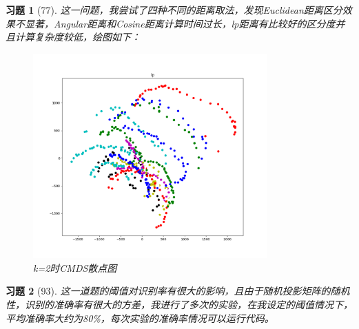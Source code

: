\documentclass[a4paper, UTF8]{ctexart}
\newtheorem*{exercise}{\textbf{习题}}
\begin{document}
  \begin{exercise}[77]
    这一问题，我尝试了四种不同的距离取法，发现Euclidean距离区分效果不显著，Angular距离和Cosine距离计算时间过长，lp距离有比较好的区分度并且计算复杂度较低，绘图如下：
    \begin{figure}[htbp!]
      \centering
      \includegraphics[width=0.8\textwidth]{fig77_1.png}
      \caption{k=2时CMDS散点图}
    \end{figure}
  \end{exercise}
  \begin{exercise}[93]
    这一道题的阈值对识别率有很大的影响，且由于随机投影矩阵的随机性，识别的准确率有很大的方差，我进行了多次的实验，在我设定的阈值情况下，平均准确率大约为80\%，每次实验的准确率情况可以运行代码。
  \end{exercise}
\end{document}

